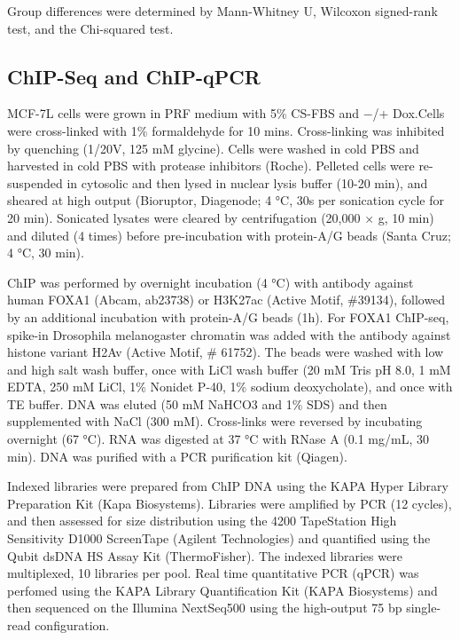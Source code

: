 \documentclass[
  12pt,
]{article}
\begin{document}
Group differences were determined by Mann-Whitney U, Wilcoxon signed-rank test, and the Chi-squared test.

\hypertarget{chip-seq-and-chip-qpcr}{%
\subsection{ChIP-Seq and ChIP-qPCR}\label{chip-seq-and-chip-qpcr}}

MCF-7L cells were grown in PRF medium with 5\% CS-FBS and −/+ Dox.Cells were cross-linked with 1\% formaldehyde for 10 mins.
Cross-linking was inhibited by quenching (1/20V, 125 mM glycine).
Cells were washed in cold PBS and harvested in cold PBS with protease inhibitors (Roche).
Pelleted cells were re-suspended in cytosolic and then lysed in nuclear lysis buffer (10-20 min), and sheared at high output (Bioruptor, Diagenode; 4 °C, 30s per sonication cycle for 20 min).
Sonicated lysates were cleared by centrifugation (20,000 × g, 10 min) and diluted (4 times) before pre-incubation with protein-A/G beads (Santa Cruz; 4 °C, 30 min).

ChIP was performed by overnight incubation (4 °C) with antibody against human FOXA1 (Abcam, ab23738) or H3K27ac (Active Motif, \#39134), followed by an additional incubation with protein-A/G beads (1h).
For FOXA1 ChIP-seq, spike-in Drosophila melanogaster chromatin was added with the antibody against histone variant H2Av (Active Motif, \# 61752).
The beads were washed with low and high salt wash buffer, once with LiCl wash buffer (20 mM Tris pH 8.0, 1 mM EDTA, 250 mM LiCl, 1\% Nonidet P-40, 1\% sodium deoxycholate), and once with TE buffer.
DNA was eluted (50 mM NaHCO3 and 1\% SDS) and then supplemented with NaCl (300 mM).
Cross-links were reversed by incubating overnight (67 °C).
RNA was digested at 37 °C with RNase A (0.1 mg/mL, 30 min).
DNA was purified with a PCR purification kit (Qiagen).

Indexed libraries were prepared from ChIP DNA using the KAPA Hyper Library Preparation Kit (Kapa Biosystems).
Libraries were amplified by PCR (12 cycles), and then assessed for size distribution using the 4200 TapeStation High Sensitivity D1000 ScreenTape (Agilent Technologies) and quantified using the Qubit dsDNA HS Assay Kit (ThermoFisher).
The indexed libraries were multiplexed, 10 libraries per pool.
Real time quantitative PCR (qPCR) was perfomed using the KAPA Library Quantification Kit (KAPA Biosystems) and then sequenced on the Illumina NextSeq500 using the high-output 75 bp single-read configuration.
\end{document}

